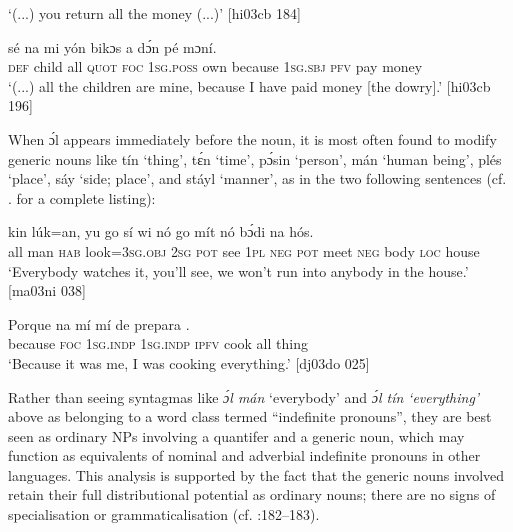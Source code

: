 \glt ‘(...) you return all the money (...)’ [hi03cb 184]
\z


\ea%
    \label{ex:key:260}
    \gll {}    sé    na  mi    yón   bikɔs
a    dɔ́n  pé  mɔní.\\
\textsc{def}  child  all  \textsc{quot}  \textsc{foc}  \textsc{1sg.poss}  own  because
\textsc{1sg.sbj}  \textsc{pfv}  pay  money\\

\glt ‘(...) all the children are mine, because I have paid money [the dowry].’ [hi03cb 196]
\z

When ɔ́l appears immediately before the noun, it is most often found to modify generic noun{\fff}s like tín ‘thing’, tɛ́n ‘time’, pɔ́sin ‘person’, mán ‘human being’, plés ‘place’, sáy ‘side; place’, and stáyl ‘manner’, as in the two following sentences (cf. . for a complete listing):


\ea%
    \label{ex:key:261}
    \gll {}   kin  lúk=an,    yu  go  sí  wi  nó  go
mít    nó  bɔ́di    na  hós.\\
all  man    \textsc{hab}  look=\textsc{3sg.obj}  \textsc{2sg}  \textsc{pot}  see  \textsc{1pl}  \textsc{neg}  \textsc{pot}
meet  \textsc{neg}  body  \textsc{loc}  house\\

\glt ‘Everybody watches it, you’ll see, we won’t run into anybody 
in the house.’ [ma03ni 038]
\z


\ea%
    \label{ex:key:262}
    \gll Porque  na  mí    mí    de  prepara   .\\
because  \textsc{foc}  \textsc{1sg.indp}  \textsc{1sg.indp}  \textsc{ipfv}  cook  all  thing\\

\glt ‘Because it was me, I was cooking everything.’ [dj03do 025]
\z

Rather than seeing syntagmas like\textit{ ɔ́l mán} ‘everybody’ and \textit{ɔ́l tín} \textit{\textup{‘everything’} }above as belonging to a word class termed “indefinite pronouns”, they are best seen as ordinary NPs involving a quantifer and a generic noun, which may function as equivalents of nominal and adverbial indefinite pronouns in other languages. This analysis is supported by the fact that the generic nouns involved retain their full distributional potential as ordinary nouns; there are no signs of specialisation or grammaticalisation (cf. \citealt{Haspelmath1994}:182–183).


